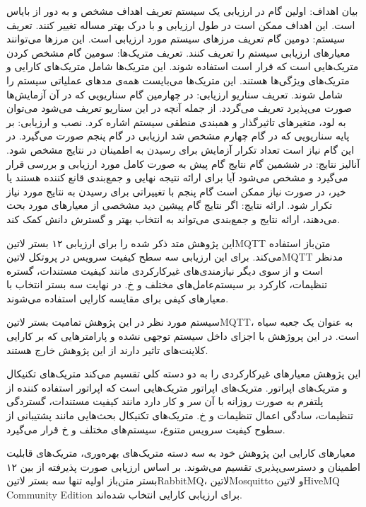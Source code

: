  بیان اهداف: اولین گام در ارزیابی یک سیستم تعریف اهداف مشخص و به دور از بایاس است. این اهداف ممکن است
در طول ارزیابی و با درک بهتر مساله تغییر کنند.
 تعریف سیستم: دومین گام تعریف مرزهای سیستم مورد ارزیابی است. این مرزها می‌توانند معیارهای ارزیابی
سیستم را تعریف کنند.
 تعریف متریک‌ها: سومین گام مشخص کردن متریک‌هایی است که قرار است استفاده شوند. این متریک‌ها شامل
متریک‌های کارایی و متریک‌های ویژگی‌ها هستند. این متریک‌ها می‌بایست همه‌ی مدهای عملیاتی سیستم را شامل شوند.
 تعریف سناریو ارزیابی: در چهارمین گام سناریویی که در آن آزمایش‌ها صورت می‌پذیرد تعریف می‌گردد. از جمله آنچه در این سناریو تعریف می‌شود
می‌توان به لود، متغیرهای تاثیرگذار و همبندی منطقی سیستم اشاره کرد.
 نصب و ارزیابی: بر پایه سناریویی که در گام چهارم مشخص شد ارزیابی در گام پنجم صورت می‌گیرد. در این گام نیاز است تعداد تکرار آزمایش برای
رسیدن به اطمینان در نتایج مشخص شود.
 آنالیز نتایج: در ششمین گام نتایج گام پیش به صورت کامل مورد ارزیابی و بررسی قرار می‌گیرد و مشخص می‌شود آیا برای ارائه نتیجه نهایی و جمع‌بندی
قانع کننده هستند یا خیر، در صورت نیاز ممکن است گام پنجم با تغییراتی برای رسیدن به نتایج مورد نیاز تکرار شود.
 ارائه نتایج: اگر نتایج گام پیشین دید مشخصی از معیارهای مورد بحث می‌دهند، ارائه نتایج و جمع‌بندی می‌تواند به انتخاب بهتر و گسترش دانش کمک کند.

این پژوهش متد ذکر شده را برای ارزیابی ۱۲ بستر ‌لاتین{MQTT} متن‌باز استفاده می‌کند. برای این ارزیابی سه سطح کیفیت سرویس در پروتکل ‌لاتین{MQTT}
مدنظر است و از سوی دیگر نیازمندی‌های غیرکارکردی مانند کیفیت مستندات، گستره تنظیمات، کارکرد بر سیستم‌عامل‌های مختلف و ‌خ. در نهایت سه بستر انتخاب
با معیارهای کیفی برای مقایسه کارایی استفاده می‌شوند.

سیستم مورد نظر در این پژوهش تمامیت بستر ‌لاتین{MQTT}، به عنوان یک جعبه سیاه است. در این پروژهش با اجزای داخل سیستم توجهی نشده و پارامترهایی که بر کارایی
کلاینت‌های تاثیر دارند از این پژوهش خارج هستند.

این پژوهش معیارهای غیرکارکردی را به دو دسته کلی تقسیم می‌کند متریک‌های تکنیکال و متریک‌های اپراتور. متریک‌های اپراتور متریک‌هایی است که اپراتور استفاده کننده از
پلتفرم به صورت روزانه با آن سر و کار دارد مانند کیفیت مستندات، گستردگی تنظیمات، سادگی اعمال تنظیمات و ‌خ. متریک‌های تکنیکال بحث‌هایی مانند پشتیبانی از سطوح
کیفیت سرویس متنوع، سیستم‌های مختلف و ‌خ قرار می‌گیرد.

معیارهای کارایی این پژوهش خود به سه دسته متریک‌های بهره‌وری، متریک‌های قابلیت اطمینان و دسترسی‌پذیری تقسیم می‌شوند.
بر اساس ارزیابی صورت پذیرفته از بین ۱۲ بستر متن‌باز اولیه تنها سه بستر ‌لاتین{RabbitMQ}، ‌لاتین{Mosquitto} و ‌لاتین{HiveMQ Community Edition}
برای ارزیابی کارایی انتخاب شده‌اند.

